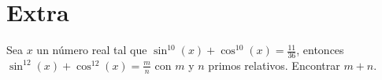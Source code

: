 \section{Extra}

\begin{section-problem}
    Sea $x$ un número real tal que $\sin^{10}(x) + \cos^{10}(x) = \frac{11}{36}$, entonces $\sin^{12}(x) + \cos^{12}(x) = \frac{m}{n}$
    con $m$ y $n$ primos relativos.
    Encontrar $m + n$.
\end{section-problem}
